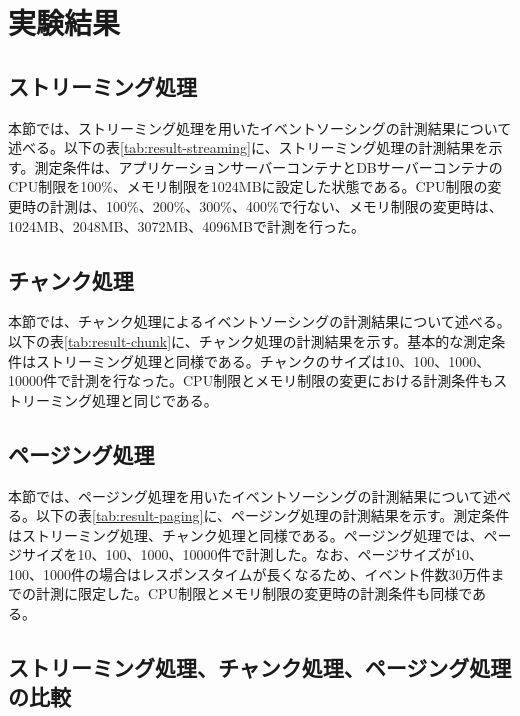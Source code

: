 \documentclass[../../main]{subfiles}
\begin{document}
    \section{実験結果}\label{sec:result}

    \subsection{ストリーミング処理}\label{subsec:result-streaming}

    本節では、ストリーミング処理を用いたイベントソーシングの計測結果について述べる。以下の表\ref{tab:result-streaming}に、ストリーミング処理の計測結果を示す。測定条件は、アプリケーションサーバーコンテナとDBサーバーコンテナのCPU制限を100\%、メモリ制限を1024MBに設定した状態である。CPU制限の変更時の計測は、100\%、200\%、300\%、400\%で行ない、メモリ制限の変更時は、1024MB、2048MB、3072MB、4096MBで計測を行った。

    

    \subsection{チャンク処理}\label{subsec:result-chunk}

    本節では、チャンク処理によるイベントソーシングの計測結果について述べる。以下の表\ref{tab:result-chunk}に、チャンク処理の計測結果を示す。基本的な測定条件はストリーミング処理と同様である。チャンクのサイズは10、100、1000、10000件で計測を行なった。CPU制限とメモリ制限の変更における計測条件もストリーミング処理と同じである。

    

    \subsection{ページング処理}\label{subsec:result-paging}

    本節では、ページング処理を用いたイベントソーシングの計測結果について述べる。以下の表\ref{tab:result-paging}に、ページング処理の計測結果を示す。測定条件はストリーミング処理、チャンク処理と同様である。ページング処理では、ページサイズを10、100、1000、10000件で計測した。なお、ページサイズが10、100、1000件の場合はレスポンスタイムが長くなるため、イベント件数30万件までの計測に限定した。CPU制限とメモリ制限の変更時の計測条件も同様である。

    

    \subsection{ストリーミング処理、チャンク処理、ページング処理の比較}\label{subsec:result-comparison}
\end{document}
